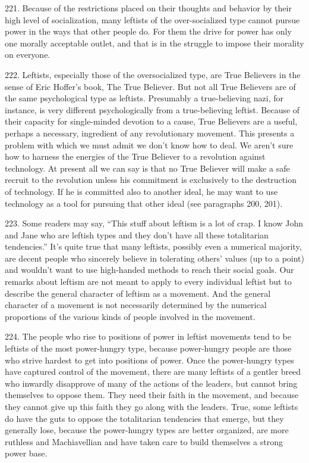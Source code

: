 \documentclass{article}
\begin{document}
221. Because of the restrictions placed on their thoughts and behavior by their high level of 
socialization, many leftists of the over-socialized type cannot pursue power in the ways that other 
people do. For them the drive for power has only one morally acceptable outlet, and that is in the 
struggle to impose their morality on everyone. \vspace{\baselineskip}

222. Leftists, especially those of the oversocialized type, are True Believers in the sense of Eric 
Hoffer’s book, The True Believer. But not all True Believers are of the same psychological type 
as leftists. Presumably a true-believing nazi, for instance, is very different psychologically from a 
true-believing leftist. Because of their capacity for single-minded devotion to a cause, True 
Believers are a useful, perhaps a necessary, ingredient of any revolutionary movement. This 
presents a problem with which we must admit we don’t know how to deal. We aren’t sure how to 
harness the energies of the True Believer to a revolution against technology. At present all we can 
say is that no True Believer will make a safe recruit to the revolution unless his commitment is 
exclusively to the destruction of technology. If he is committed also to another ideal, he may want 
to use technology as a tool for pursuing that other ideal (see paragraphs 200, 201). \vspace{\baselineskip}

223. Some readers may say, “This stuff about leftism is a lot of crap. I know John and Jane who 
are leftish types and they don’t have all these totalitarian tendencies.” It’s quite true that many 
leftists, possibly even a numerical majority, are decent people who sincerely believe in tolerating 
others’ values (up to a point) and wouldn’t want to use high-handed methods to reach their social 
goals. Our remarks about leftism are not meant to apply to every individual leftist but to describe 
the general character of leftism as a movement. And the general character of a movement is not 
necessarily determined by the numerical proportions of the various kinds of people involved in the 
movement. \vspace{\baselineskip}

224. The people who rise to positions of power in leftist movements tend to be leftists of the most 
power-hungry type, because power-hungry people are those who strive hardest to get into positions 
of power. Once the power-hungry types have captured control of the movement, there are many 
leftists of a gentler breed who inwardly disapprove of many of the actions of the leaders, but cannot 
bring themselves to oppose them. They need their faith in the movement, and because they cannot 
give up this faith they go along with the leaders. True, some leftists do have the guts to oppose the 
totalitarian tendencies that emerge, but they generally lose, because the power-hungry types are 
better organized, are more ruthless and Machiavellian and have taken care to build themselves a 
strong power base. \vspace{\baselineskip}
\end{document}

